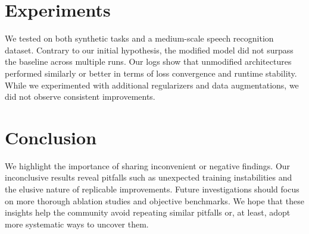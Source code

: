 \documentclass{article}
\begin{document}
\section{Experiments}
We tested on both synthetic tasks and a medium-scale speech recognition dataset. Contrary to our initial hypothesis, the modified model did not surpass the baseline across multiple runs. Our logs show that unmodified architectures performed similarly or better in terms of loss convergence and runtime stability. While we experimented with additional regularizers and data augmentations, we did not observe consistent improvements.

\section{Conclusion}
We highlight the importance of sharing inconvenient or negative findings. Our inconclusive results reveal pitfalls such as unexpected training instabilities and the elusive nature of replicable improvements. Future investigations should focus on more thorough ablation studies and objective benchmarks. We hope that these insights help the community avoid repeating similar pitfalls or, at least, adopt more systematic ways to uncover them.



\end{document}
